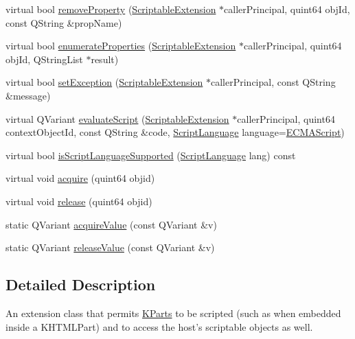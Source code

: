 \begin{DoxyCompactItemize}
\item 
virtual bool \hyperlink{classKParts_1_1ScriptableExtension_a72c9018ac01d931c4218ddbf963f93fb}{remove\+Property} (\hyperlink{classKParts_1_1ScriptableExtension}{Scriptable\+Extension} $\ast$caller\+Principal, quint64 obj\+Id, const Q\+String \&prop\+Name)
\item 
virtual bool \hyperlink{classKParts_1_1ScriptableExtension_a7630a47519df9f1ad5741e8d7cc436c2}{enumerate\+Properties} (\hyperlink{classKParts_1_1ScriptableExtension}{Scriptable\+Extension} $\ast$caller\+Principal, quint64 obj\+Id, Q\+String\+List $\ast$result)
\item 
virtual bool \hyperlink{classKParts_1_1ScriptableExtension_ac27156b3a945cb5ac69bbdfb18a501e8}{set\+Exception} (\hyperlink{classKParts_1_1ScriptableExtension}{Scriptable\+Extension} $\ast$caller\+Principal, const Q\+String \&message)
\item 
virtual Q\+Variant \hyperlink{classKParts_1_1ScriptableExtension_ae3ece3d86bd1410a0954e7dafc037d61}{evaluate\+Script} (\hyperlink{classKParts_1_1ScriptableExtension}{Scriptable\+Extension} $\ast$caller\+Principal, quint64 context\+Object\+Id, const Q\+String \&code, \hyperlink{classKParts_1_1ScriptableExtension_ae24e9c2e1e132201ddc092b8b069be23}{Script\+Language} language=\hyperlink{classKParts_1_1ScriptableExtension_ae24e9c2e1e132201ddc092b8b069be23a53f57a3152be4d9428e8ee66c0614882}{E\+C\+M\+A\+Script})
\item 
virtual bool \hyperlink{classKParts_1_1ScriptableExtension_adc8ddc26449ab07abdf05dab5fb06af1}{is\+Script\+Language\+Supported} (\hyperlink{classKParts_1_1ScriptableExtension_ae24e9c2e1e132201ddc092b8b069be23}{Script\+Language} lang) const 
\item 
virtual void \hyperlink{classKParts_1_1ScriptableExtension_aa9d21d12e60a00fa4adb0a3db0f52cad}{acquire} (quint64 objid)
\item 
virtual void \hyperlink{classKParts_1_1ScriptableExtension_a1a06fcb64081a052d29baae2376c371b}{release} (quint64 objid)
\item 
static Q\+Variant \hyperlink{classKParts_1_1ScriptableExtension_a048b779677ccf0e99e90b101281d31bc}{acquire\+Value} (const Q\+Variant \&v)
\item 
static Q\+Variant \hyperlink{classKParts_1_1ScriptableExtension_a45af0ab34d52c57452910b6161922c3c}{release\+Value} (const Q\+Variant \&v)
\end{DoxyCompactItemize}


\subsection{Detailed Description}
An extension class that permits \hyperlink{namespaceKParts}{K\+Parts} to be scripted (such as when embedded inside a K\+H\+T\+M\+L\+Part) and to access the host's scriptable objects as well.

